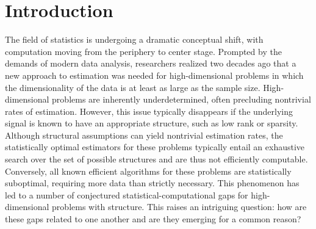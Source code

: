  \section{Introduction}

The field of statistics is undergoing a dramatic conceptual shift, with computation moving from the periphery to center stage. Prompted by the demands of modern data analysis, researchers realized two decades ago that a new approach to estimation was needed for high-dimensional problems in which the dimensionality of the data is at least as large as the sample size. High-dimensional problems are inherently underdetermined, often precluding nontrivial rates of estimation. However, this issue typically disappears if the underlying signal is known to have an appropriate structure, such as low rank or sparsity.
Although structural assumptions can yield nontrivial estimation rates, the statistically optimal estimators for these problems typically entail an exhaustive search over the set of possible structures and are thus not efficiently computable. Conversely, all known efficient algorithms for these problems are statistically suboptimal, requiring more data than strictly necessary. This phenomenon has led to a number of conjectured statistical-computational gaps for high-dimensional problems with structure. This raises an intriguing question: how are these gaps related to one another and are they emerging for a common reason?


